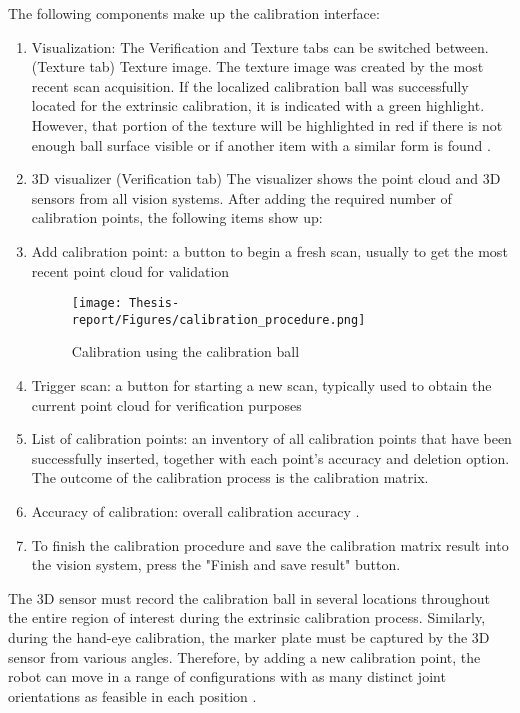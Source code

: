 \documentclass[12pt]{article}
\begin{document}
The following components make up the calibration interface:
\begin{enumerate}
    \item   Visualization: The Verification and Texture tabs can be switched between.
 (Texture tab) Texture image. The texture image was created by the most recent scan acquisition. If the localized calibration ball was successfully located for the extrinsic calibration, it is indicated with a green highlight. However, that portion of the texture will be highlighted in red if there is not enough ball surface visible or if another item with a similar form is found \cite{ref2}.
 \item   3D visualizer (Verification tab) 
The visualizer shows the point cloud and 3D sensors from all vision systems.
 After adding the required number of calibration points, the following items show up: \cite{ref2}
\item  Add calibration point: a button to begin a fresh scan, usually to get the most recent point cloud for validation \cite{ref2}
\begin{figure}[h]
    \centering
    \texttt{[image: Thesis-report/Figures/calibration\_procedure.png]}
    \caption{Calibration using the calibration ball \cite{ref2} }
    \label{fig:Photoneo Cmaera}
\end{figure} 

\item   Trigger scan: a button for starting a new scan, typically used to obtain the current point cloud for verification purposes \cite{ref2}
\item  List of calibration points: an inventory of all calibration points that have been successfully inserted, together with each point's accuracy and deletion option. The outcome of the calibration process is the calibration matrix\cite{ref2}.
\item   Accuracy of calibration: overall calibration accuracy \cite{ref2}.
\item  To finish the calibration procedure and save the calibration matrix result into the vision system, press the "Finish and save result" button\cite{ref2}.
\end{enumerate}

The 3D sensor must record the calibration ball in several locations throughout the entire region of interest during the extrinsic calibration process. Similarly, during the hand-eye calibration, the marker plate must be captured by the 3D sensor from various angles.  Therefore, by adding a new calibration point, the robot can move in a range of configurations with as many distinct joint orientations as feasible in each position \cite{ref2}.
\end{document}
